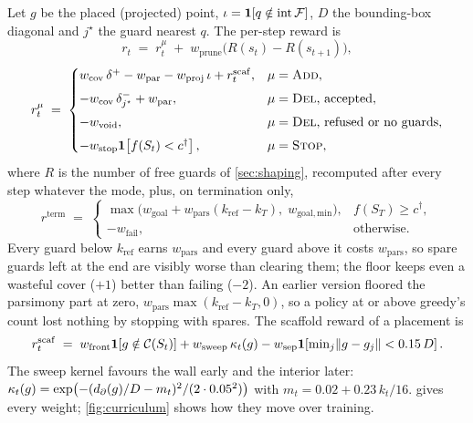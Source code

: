 \documentclass[11pt,a4paper]{article}
\begin{document}
Let $g$ be the placed (projected) point, $\iota = \mathbf{1}\!\left[q \notin \operatorname{int}\mathcal{F}\right]$,
$D$ the bounding-box diagonal and $j^\star$ the guard nearest $q$. The per-step reward is
\[
r_t \;=\; r^{\mu}_t \;+\; w_{\mathrm{prune}}\bigl(R(s_t) - R(s_{t+1})\bigr),
\]
\[
r^{\mu}_t \;=\;
\begin{cases}
  w_{\mathrm{cov}}\,\delta^+ - w_{\mathrm{par}} - w_{\mathrm{proj}}\,\iota + r^{\mathrm{scaf}}_t, & \mu=\textsc{Add}, \\[4pt]
  -w_{\mathrm{cov}}\,\delta^-_{j^\star} + w_{\mathrm{par}}, & \mu=\textsc{Del}\text{, accepted}, \\[4pt]
  -w_{\mathrm{void}}, & \mu=\textsc{Del}\text{, refused or no guards}, \\[4pt]
  -w_{\mathrm{stop}}\mathbf{1}\!\left[f(S_t) < c^\dagger\right], & \mu=\textsc{Stop},
\end{cases}
\]
where $R$ is the number of free guards of \cref{sec:shaping}, recomputed after every step
whatever the mode, plus, on termination only,
\[
  r^{\mathrm{term}} \;=\;
  \begin{cases}
    \max\bigl(w_{\mathrm{goal}} + w_{\mathrm{pars}}(k_{\mathrm{ref}} - k_T),\; w_{\mathrm{goal,min}}\bigr), & f(S_T)\ge c^\dagger,\\
    -w_{\mathrm{fail}}, & \text{otherwise.}
  \end{cases}
\]
Every guard below $k_{\mathrm{ref}}$ earns $w_{\mathrm{pars}}$ and every guard above it costs
$w_{\mathrm{pars}}$, so spare guards left at the end are visibly worse than clearing them; the
floor keeps even a wasteful cover ($+1$) better than failing ($-2$). An earlier version floored
the parsimony part at zero, $w_{\mathrm{pars}}\max(k_{\mathrm{ref}}-k_T,0)$, so a policy at or
above greedy's count lost nothing by stopping with spares. The scaffold reward of a placement is
\[
  r^{\mathrm{scaf}}_t \;=\; w_{\mathrm{front}}\mathbf{1}\!\left[g\notin\mathcal{C}(S_t)\right] + w_{\mathrm{sweep}}\,\kappa_t(g)
  - w_{\mathrm{sep}}\mathbf{1}\!\left[\textstyle\min_j\lVert g-g_j\rVert < 0.15\,D\right].
\]
The sweep kernel favours the wall early and the interior later:
$\kappa_t(g) = \exp\bigl(-(d_{\partial}(g)/D - m_t)^2/(2\cdot0.05^2)\bigr)$ with
$m_t = 0.02 + 0.23\,k_t/16$.  gives every weight;
\cref{fig:curriculum} shows how they move over training.
\end{document}
